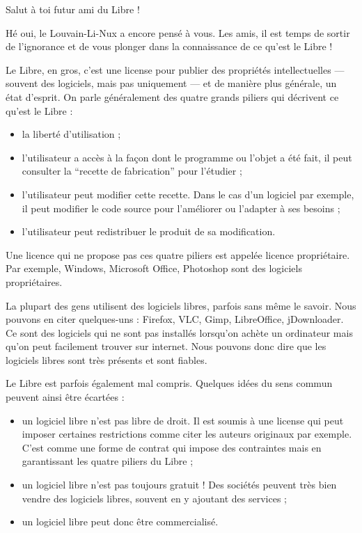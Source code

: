 \documentclass[12pt]{../fiche}
\begin{document}

Salut à toi futur ami du Libre ! 
\vspace{0.8em}

Hé oui, le Louvain-Li-Nux a encore pensé à vous. Les amis, il est temps de sortir de l'ignorance et de vous plonger dans la connaissance de ce qu'est le Libre !
\vspace{0.8em}

Le Libre, en gros, c'est une license pour publier des propriétés intellectuelles --- souvent des logiciels, mais pas uniquement --- et de manière plus générale, un état d'esprit. On parle généralement des \og{}quatre grands piliers\fg{} qui décrivent ce qu'est le Libre :
\begin{itemize}
\item la liberté d'utilisation ;
\item l'utilisateur a accès à la façon dont le programme ou l'objet a été fait, il peut consulter la “recette de fabrication” pour l'étudier ;
\item l'utilisateur peut modifier cette recette. Dans le cas d'un logiciel par exemple, il peut modifier le code source pour l'améliorer ou l'adapter à ses besoins ;
\item l'utilisateur peut redistribuer le produit de sa modification.
\end{itemize}

Une licence qui ne propose pas ces quatre piliers est appelée licence propriétaire. Par exemple, Windows, Microsoft Office, Photoshop sont des logiciels propriétaires.

\vspace{0.8em}

La plupart des gens utilisent des logiciels libres, parfois sans même le savoir. Nous pouvons en citer quelques-uns : Firefox, VLC, Gimp, LibreOffice, jDownloader. Ce sont des logiciels qui ne sont pas installés lorsqu'on achète un ordinateur mais qu'on peut facilement trouver sur internet. Nous pouvons donc dire que les logiciels libres sont très présents et sont fiables.
\vspace{0.8em}

Le Libre est parfois également mal compris. Quelques idées du sens commun peuvent ainsi être écartées :
\begin{itemize}
\item un logiciel libre n'est pas libre de droit. Il est soumis à une license qui peut imposer certaines restrictions comme citer les auteurs originaux par exemple. C'est comme une forme de contrat qui impose des contraintes mais en garantissant les quatre piliers du Libre ;
\item un logiciel libre n'est pas toujours gratuit ! Des sociétés peuvent très bien vendre des logiciels libres, souvent en y ajoutant des services ;
\item un logiciel libre peut donc être commercialisé.
\end{itemize}
\end{document}
